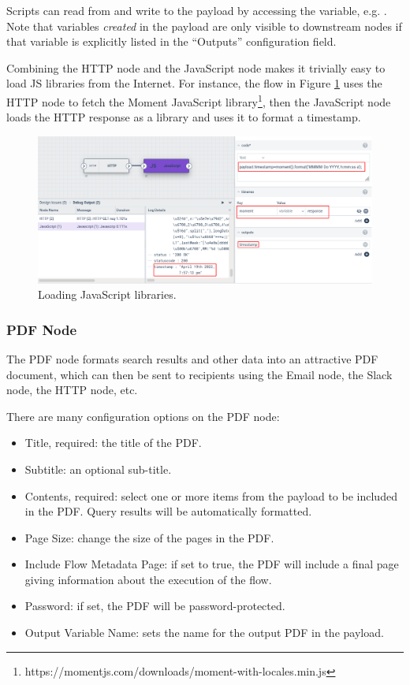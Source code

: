 Scripts can read from and write to the payload by accessing the  variable, e.g. . Note that variables \emph{created} in the payload are only visible to downstream nodes if that variable is explicitly listed in the ``Outputs'' configuration field.

Combining the HTTP node and the JavaScript node makes it trivially easy to load JS libraries from the Internet. For instance, the flow in Figure \ref{fig:js-flow} uses the HTTP node to fetch the Moment JavaScript library\footnote{https://momentjs.com/downloads/moment-with-locales.min.js}, then the JavaScript node loads the HTTP response as a library and uses it to format a timestamp.

\begin{figure}
	\includegraphics[width=0.85\linewidth]{images/js-flow.png}
	\caption{Loading JavaScript libraries.}
	\label{fig:js-flow}
\end{figure}

\subsubsection{PDF Node}
The PDF node formats search results and other data into an attractive PDF document, which can then be sent to recipients using the Email node, the Slack node, the HTTP node, etc.

There are many configuration options on the PDF node:

\begin{itemize}
\item Title, required: the title of the PDF.
\item Subtitle: an optional sub-title.
\item Contents, required: select one or more items from the payload to be included in the PDF. Query results will be automatically formatted.
\item Page Size: change the size of the pages in the PDF.
\item Include Flow Metadata Page: if set to true, the PDF will include a final page giving information about the execution of the flow.
\item Password: if set, the PDF will be password-protected.
\item Output Variable Name: sets the name for the output PDF in the payload.
\end{itemize}


